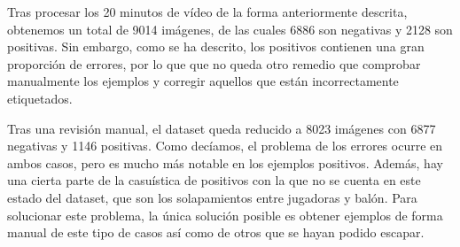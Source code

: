 Tras procesar los 20 minutos de vídeo de la forma anteriormente descrita, obtenemos un total de 9014 imágenes, de las cuales 6886 son negativas y 2128 son positivas. Sin embargo, como se ha descrito, los positivos contienen una gran proporción de errores, por lo que que no queda otro remedio que comprobar manualmente los ejemplos y corregir aquellos que están incorrectamente etiquetados.

Tras una revisión manual, el dataset queda reducido a 8023 imágenes con 6877 negativas y 1146 positivas. Como decíamos, el problema de los errores ocurre en ambos casos, pero es mucho más notable en los ejemplos positivos. Además, hay una cierta parte de la casuística de positivos con la que no se cuenta en este estado del dataset, que son los solapamientos entre jugadoras y balón. Para solucionar este problema, la única solución posible es obtener ejemplos de forma manual de este tipo de casos así como de otros que se hayan podido escapar.

